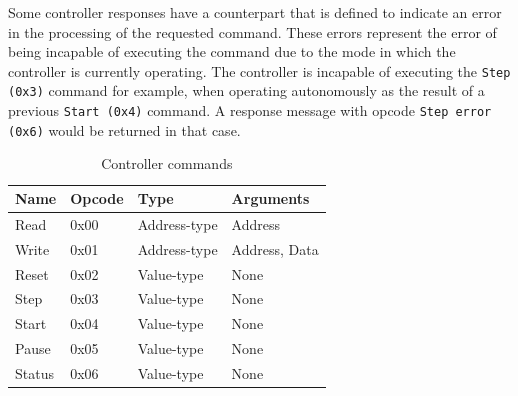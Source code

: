 \documentclass[main.tex]{subfiles}
\begin{document}
Some controller responses have a counterpart that is defined to indicate an error in the processing of the requested command. These errors represent the error of being incapable of executing the command due to the mode in which the controller is currently operating. The controller is incapable of executing the \texttt{Step (0x3)} command for example, when operating autonomously as the result of a previous \texttt{Start (0x4)} command. A response message with opcode \texttt{Step error (0x6)} would be returned in that case. 

\setlength{\tabcolsep}{8pt}
\renewcommand{\arraystretch}{1.2}

\begin{table}[h]
    \footnotesize
    \caption{Controller commands}
    \label{tbl:opcodes-cmd}
    \centering
    \begin{tabular}{|l|l|l|l|}
        \hline
        \textbf{Name} & \textbf{Opcode} & \textbf{Type} & \textbf{Arguments}    \\ \hline
        Read          & 0x00            & Address-type  & Address               \\
        Write         & 0x01            & Address-type  & Address, Data         \\
        Reset         & 0x02            & Value-type    & None                  \\
        Step          & 0x03            & Value-type    & None                  \\
        Start         & 0x04            & Value-type    & None                  \\
        Pause         & 0x05            & Value-type    & None                  \\
        Status        & 0x06            & Value-type    & None                  \\ \hline
    \end{tabular}
\end{table}
\end{document}
